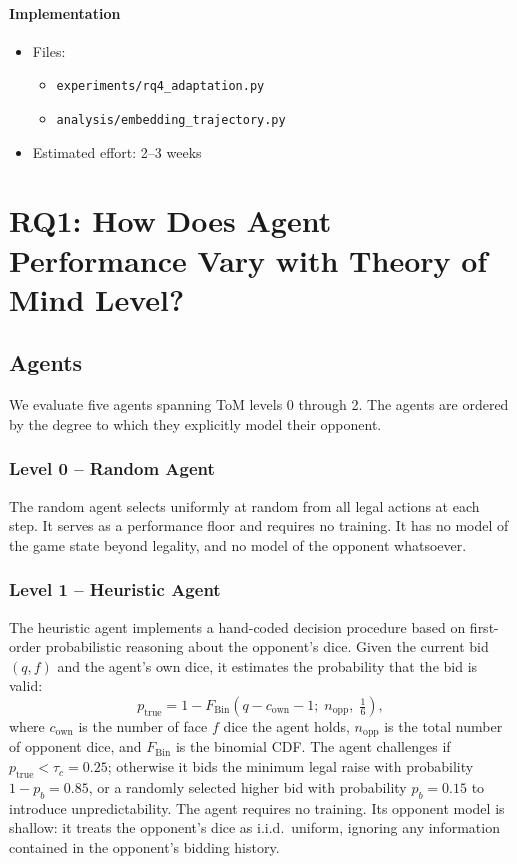 \documentclass{article}
\begin{document}
\paragraph{Implementation}
\begin{itemize}
    \item Files:
    \begin{itemize}
        \item \texttt{experiments/rq4\_adaptation.py}
        \item \texttt{analysis/embedding\_trajectory.py}
    \end{itemize}
    \item Estimated effort: 2--3 weeks
\end{itemize}

\section{RQ1: How Does Agent Performance Vary with Theory of Mind Level?}

  \subsection{Agents}

  We evaluate five agents spanning ToM levels 0 through 2. The agents are ordered
  by the degree to which they explicitly model their opponent.

  \subsubsection{Level 0 -- Random Agent}

  The random agent selects uniformly at random from all legal actions at each
  step. It serves as a performance floor and requires no training. It has no model
  of the game state beyond legality, and no model of the opponent whatsoever.

  \subsubsection{Level 1 -- Heuristic Agent}

  The heuristic agent implements a hand-coded decision procedure based on
  first-order probabilistic reasoning about the opponent's dice. Given the current
  bid $(q, f)$ and the agent's own dice, it estimates the probability that the bid
  is valid:
  \[
    p_{\text{true}} = 1 - F_{\text{Bin}}\!\left(q - c_{\text{own}} - 1;\;
      n_{\text{opp}},\; \tfrac{1}{6}\right),
  \]
  where $c_{\text{own}}$ is the number of face $f$ dice the agent holds,
  $n_{\text{opp}}$ is the total number of opponent dice, and $F_{\text{Bin}}$ is
  the binomial CDF. The agent challenges if $p_{\text{true}} < \tau_c = 0.25$;
  otherwise it bids the minimum legal raise with probability $1 - p_b = 0.85$, or
  a randomly selected higher bid with probability $p_b = 0.15$ to introduce
  unpredictability. The agent requires no training. Its opponent model is shallow:
  it treats the opponent's dice as i.i.d.\ uniform, ignoring any information
  contained in the opponent's bidding history.
\end{document}
